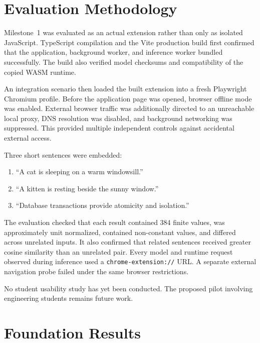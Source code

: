 \documentclass{tietreport}
\begin{document}
\section{Evaluation Methodology}

Milestone~1 was evaluated as an actual extension rather than only as isolated JavaScript.
TypeScript compilation and the Vite production build first confirmed that the application,
background worker, and inference worker bundled successfully. The build also verified model
checksums and compatibility of the copied WASM runtime.

An integration scenario then loaded the built extension into a fresh Playwright Chromium
profile. Before the application page was opened, browser offline mode was enabled. External
browser traffic was additionally directed to an unreachable local proxy, DNS resolution was
disabled, and background networking was suppressed. This provided multiple independent
controls against accidental external access.

Three short sentences were embedded:

\begin{enumerate}
  \item ``A cat is sleeping on a warm windowsill.''
  \item ``A kitten is resting beside the sunny window.''
  \item ``Database transactions provide atomicity and isolation.''
\end{enumerate}

The evaluation checked that each result contained 384 finite values, was approximately unit
normalized, contained non-constant values, and differed across unrelated inputs. It also
confirmed that related sentences received greater cosine similarity than an unrelated pair.
Every model and runtime request observed during inference used a
\texttt{chrome-extension://} URL. A separate external navigation probe failed under the same
browser restrictions.

No student usability study has yet been conducted. The proposed pilot involving engineering
students remains future work.

\section{Foundation Results}
\end{document}
